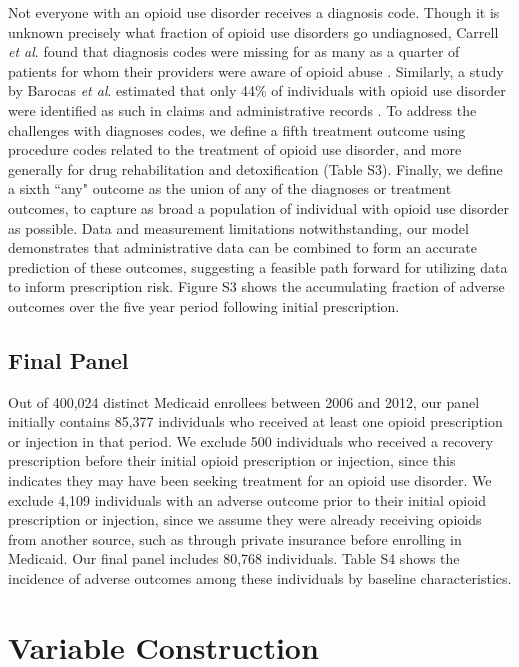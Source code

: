 \documentclass[9pt,twoside,lineno]{pnas-new}
\begin{document}
Not everyone with an opioid use disorder receives a diagnosis code. Though it is unknown precisely what fraction of opioid use disorders go undiagnosed, Carrell {\em et al}. found that diagnosis codes were missing for as many as a quarter of patients for whom their providers were aware of opioid abuse \cite{carrell}. Similarly, a study by Barocas {\em et al}. estimated that only 44\% of individuals with opioid use disorder were identified as such in claims and administrative records \cite{barocas}. To address the challenges with diagnoses codes, we define a fifth treatment outcome using procedure codes related to the treatment of opioid use disorder, and more generally for drug rehabilitation and detoxification (Table S3). Finally, we define a sixth ``any" outcome as the union of any of the diagnoses or treatment outcomes, to capture as broad a population of individual with opioid use disorder as possible. Data and measurement limitations notwithstanding, our model demonstrates that administrative data can be combined to form an accurate prediction of these outcomes, suggesting a feasible path forward for utilizing data to inform prescription risk. Figure S3 shows the accumulating fraction of adverse outcomes over the five year period following initial prescription.

\subsection{Final Panel}

Out of 400,024 distinct Medicaid enrollees between 2006 and 2012, our panel initially contains 85,377 individuals who received at least one opioid prescription or injection in that period. We exclude 500 individuals who received a recovery prescription before their initial opioid prescription or injection, since this indicates they may have been seeking treatment for an opioid use disorder. We exclude 4,109 individuals with an adverse outcome prior to their initial opioid prescription or injection, since we assume they were already receiving opioids from another source, such as through private insurance before enrolling in Medicaid. Our final panel includes 80,768 individuals. Table S4 shows the incidence of adverse outcomes among these individuals by baseline characteristics.

\section{Variable Construction}
\end{document}
